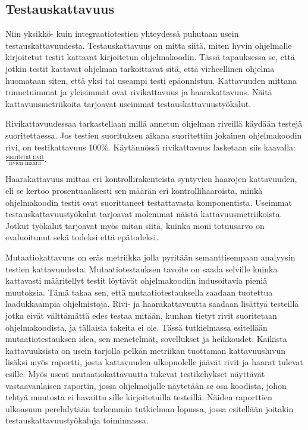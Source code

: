 \documentclass{tktltiki}
\begin{document}
\subsection{Testauskattavuus}
Niin yksikkö- kuin integraatiotestien yhteydessä puhutaan usein testauskattavuudesta. Testauskattavuus on mitta siitä, miten hyvin ohjelmalle kirjoitetut testit kattavat kirjoitetun ohjelmakoodin. Tässä tapauksessa se, että jotkin testit kattavat ohjelman tarkoittavat sitä, että virheellinen ohjelma huomataan siten, että yksi tai useampi testi epäonnistuu. Kattavuuden mittana tunnetuimmat ja yleisimmät ovat rivikattavuus ja haarakattavuus. Näitä kattavuusmetriikoita tarjoavat useimmat testauskattavuustyökalut.

Rivikattavuudessaa tarkastellaan millä annetun ohjelman riveillä käydään testejä suoritettaessa. Jos testien suorituksen aikana suoritettiin jokainen ohjelmakoodin rivi, on testikattavuus 100\%. Käytännössä rivikattavuus lasketaan siis kaavalla: $\frac{\text{suoritetut rivit}}{\text{rivien määrä}}$.

Haarakattavuus mittaa eri kontrollirakenteista syntyvien haarojen kattavuuden, eli se kertoo prosentuaalisesti sen määrän eri kontrollihaaroista, minkä ohjelmakoodin testit ovat suorittaneet testattavasta komponentista. Useimmat testauskattavuustyökalut tarjoavat molemmat näistä kattavuusmetriikoista. Jotkut työkalut tarjoavat myös mitan siitä, kuinka moni totuusarvo on evaluoitunut sekä todeksi että epätodeksi.

Mutaatiokattavuus on eräs metriikka jolla pyritään semanttisempaan analyysin testien kattavuudesta. Mutaatiotestauksen tavoite on saada selville kuinka kattavasti määritellyt testit löytävät ohjelmakoodiin indusoitavia pieniä muutoksia. Tämä takaa sen, että mutaatiotestauksella saadaan tuotettua laadukkaampia ohjelmistoja. Rivi- ja haarakattavuutta saadaan lisättyä testeillä jotka eivät välttämättä edes testaa mitään, kunhan tietyt rivit suoritetaan ohjelmakoodista, ja tällaisia takeita ei ole. Tässä tutkielmassa esitellään mutaatiotestauksen idea, sen menetelmät, sovellukset ja heikkoudet. Kaikista kattavuuksista on usein tarjolla pelkän metriikan tuottaman kattavuusluvun lisäksi myös raportti, josta kattavuuden ulkopuolelle jäävät rivit ja haarat tulevat esille. Myös useat mutaatiokattavuutta tukevat testikehykset näyttävät vastaavanlaisen raportin, jossa ohjelmoijalle näytetään se osa koodista, johon tehtyä muutosta ei havaittu sille kirjoitetuilla testeillä. Näiden raporttien ulkoasuun perehdytään tarkemmin tutkielman lopussa, jossa esitellään joitakin testauskattavuustyökaluja toiminnassa.
\end{document}
